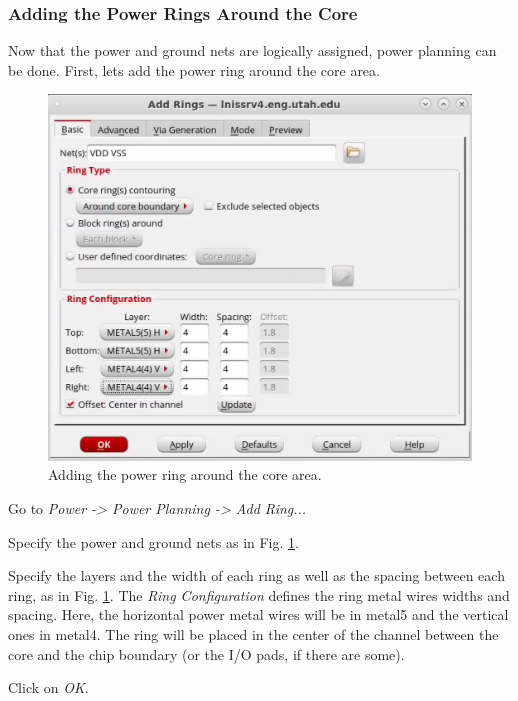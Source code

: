 \subsubsection{Adding the Power Rings Around the Core}
Now that the power and ground nets are logically assigned, power planning can be done. First, lets add the power ring around the core area.
\begin{enumerate}
	\parbox[t]{\dimexpr\textwidth-\leftmargin}{%
		\begin{figure}
			\vspace{-10mm}
			\centering
			\vspace{-\baselineskip}
		\includegraphics[scale=0.35]{figures/lab5_backend/addring}
\caption{Adding the power ring around the core area.}
			\label{fig_addring}
		\end{figure}
	\item Go to \textit{Power -> Power Planning -> Add Ring...}
\item Specify the power and ground nets as in Fig. \ref{fig_addring}.
\item Specify the layers and the width of each ring as well as the spacing between each ring, as in Fig. \ref{fig_addring}. The \textit{Ring Configuration} defines the ring metal wires widths and spacing. Here, the horizontal power metal wires will be in metal5 and the vertical ones in metal4. The ring will be placed in the center of the channel between the core and the chip boundary (or the I/O pads, if there are some).
\item Click on \textit{OK}.	
	}
\end{enumerate}
